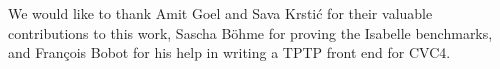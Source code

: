 \documentclass{svjour3}                     %
\begin{document}
\begin{acknowledgements}
We would like to thank Amit Goel and Sava Krsti\'c for their valuable contributions to this work,
Sascha B\"ohme for proving the Isabelle benchmarks,
and Fran\c{c}ois Bobot for his help in writing a TPTP front end for CVC4.
\end{acknowledgements}


\end{document}
